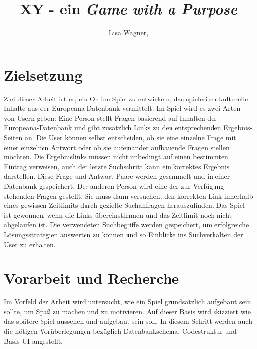 \documentclass{llncs}
\begin{document}
%
%
\pagestyle{headings}  %
%
%
\title{XY - ein \emph{Game with a Purpose}} 
%
\author{Lisa Wagner,\\
}
%

\maketitle              %

\pagestyle{plain}		%


%
%
\section{Zielsetzung} 
\label{sec:zielsetzung}
Ziel dieser Arbeit ist es, ein Online-Spiel zu entwickeln, das spielerisch kulturelle Inhalte aus der Europeana-Datenbank vermittelt. 
Im Spiel wird es zwei Arten von Usern geben: Eine Person stellt Fragen basierend auf Inhalten der Europeana-Datenbank und gibt zusätzlich Links zu den entsprechenden Ergebnis-Seiten an. Die User können selbst entscheiden, ob sie eine einzelne Frage mit einer einzelnen Antwort oder ob sie aufeinander aufbauende Fragen stellen möchten. Die Ergebnislinks müssen nicht unbedingt auf einen bestimmten Eintrag verweisen, auch der letzte Suchschritt kann ein korrektes Ergebnis darstellen.
Diese Frage-und-Antwort-Paare werden gesammelt und in einer Datenbank gespeichert. Der anderen Person wird eine der zur Verfügung stehenden Fragen gestellt. Sie muss dann versuchen, den korrekten Link innerhalb eines gewissen Zeitlimits durch gezielte Suchanfragen herauszufinden. Das Spiel ist gewonnen, wenn die Links übereinstimmen und das Zeitlimit noch nicht abgelaufen ist. \newline
Die verwendeten Suchbegriffe werden gespeichert, um erfolgreiche Lösungsstrategien auswerten zu können und so Einblicke ins Suchverhalten der User zu erhalten.



\section{Vorarbeit und Recherche}
%
Im Vorfeld der Arbeit wird untersucht, wie ein Spiel grundsätzlich aufgebaut sein sollte, um Spaß zu machen und zu motivieren. Auf dieser Basis wird skizziert wie das spätere Spiel aussehen und aufgebaut sein soll.
\newline
In diesem Schritt werden auch die nötigen Vorüberlegungen bezüglich Datenbankschema, Codestruktur und Basis-UI angestellt.
\newpage
\end{document}
